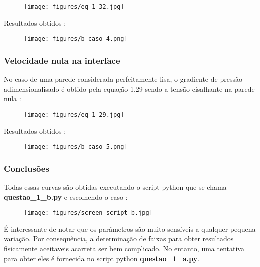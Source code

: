 \documentclass[a4paper, 11pt]{article}
\begin{document}
\begin{figure}[H]
  \begin{center}
  \texttt{[image: figures/eq\_1\_32.jpg]}  
\end{center} \end{figure}

Resultados obtidos :
\begin{figure}[H]
  \texttt{[image: figures/b\_caso\_4.png]}  
\end{figure}

\subsubsection{Velocidade nula na interface}
No caso de uma parede considerada perfeitamente lisa, o gradiente de pressão adimensionalisado é obtido pela equação 1.29 sendo a tensão cisalhante na parede nula :

\begin{figure}[H]
  \begin{center}
  \texttt{[image: figures/eq\_1\_29.jpg]}  
\end{center} \end{figure}

Resultados obtidos :
\begin{figure}[H]
  \texttt{[image: figures/b\_caso\_5.png]}  
\end{figure}

\subsubsection{Conclusões}
Todas essas curvas são obtidas executando o script python que se chama \textbf{questao\_1\_b.py} e escolhendo o caso :
\begin{figure}[H]
  \texttt{[image: figures/screen\_script\_b.jpg]}  
\end{figure}

É interessante de notar que os parâmetros são muito sensíveis a qualquer pequena variação. Por consequência, a determinação de faixas para obter resultados fisicamente aceitaveis acarreta ser bem complicado.
No entanto, uma tentativa para obter eles é fornecida no script python \textbf{questao\_1\_a.py}.

\newpage
\end{document}
